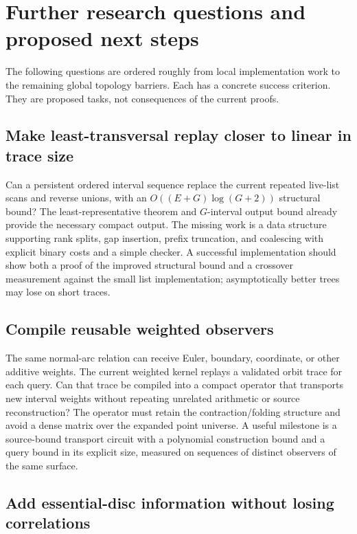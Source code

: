 \section{Further research questions and proposed next steps}
\label{sec:research}

The following questions are ordered roughly from local implementation work
to the remaining global topology barriers. Each has a concrete success
criterion. They are proposed tasks, not consequences of the current proofs.

\subsection{Make least-transversal replay closer to linear in trace size}

Can a persistent ordered interval sequence replace the current repeated
live-list scans and reverse unions, with an
$O((E+G)\log(G+2))$ structural bound? The least-representative theorem and
$G$-interval output bound already provide the necessary compact output.
The missing work is a data structure supporting rank splits, gap insertion,
prefix truncation, and coalescing with explicit binary costs and a simple
checker. A successful implementation should show both a proof of the
improved structural bound and a crossover measurement against the small
list implementation; asymptotically better trees may lose on short traces.

\subsection{Compile reusable weighted observers}

The same normal-arc relation can receive Euler, boundary, coordinate, or
other additive weights. The current weighted kernel replays a validated
orbit trace for each query. Can that trace be compiled into a compact
operator that transports new interval weights without repeating unrelated
arithmetic or source reconstruction? The operator must retain the
contraction/folding structure and avoid a dense matrix over the expanded
point universe. A useful milestone is a source-bound transport circuit
with a polynomial construction bound and a query bound in its explicit
size, measured on sequences of distinct observers of the same surface.

\subsection{Add essential-disc information without losing correlations}

